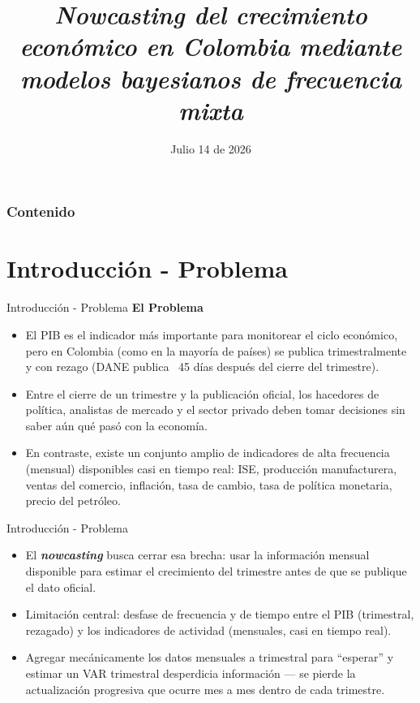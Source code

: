 \documentclass{beamer}
\title[35° Simposio Internacional de Estadística]{\textit{\textbf{Nowcasting} del crecimiento económico en Colombia mediante modelos bayesianos de frecuencia mixta}}
\author[Moreno, Olivero y Campo (2026). Nowcasting bayesiano]{Juan Diego Moreno Sánchez \inst{1} \and \and Zeneth Olivero Tapia \inst{2} \\[0.1cm]
\and Jacobo Campo Robledo \inst{1}^{,} \inst{2}}
\institute[Universidad Externado de Colombia -- Universidad Católica de Colombia]
{ 
		\inst{1} Universidad Externado de Colombia
		\and 	
		\inst{2} Universidad Católica de Colombia
}
\date{\footnotesize{Julio 14 de 2026}}
\begin{document}
\begin{frame}
	\titlepage
\end{frame}

\begin{frame}
	\frametitle{Contenido}
\end{frame}


\section{Introducción - Problema}

\begin{frame}{Introducción - Problema}
\textcolor[rgb]{0,0,1}{\textbf{El Problema}} 
\begin{itemize}\justifying
	\item El PIB es el indicador más importante para monitorear el ciclo económico, pero en Colombia (como en la mayoría de países) se publica trimestralmente y con rezago (DANE publica ~45 días después del cierre del trimestre). \pause
	\item Entre el cierre de un trimestre y la publicación oficial, los hacedores de política, analistas de mercado y el sector privado deben tomar decisiones sin saber aún qué pasó con la economía. \pause
	\item En contraste, existe un conjunto amplio de indicadores de alta frecuencia (mensual) disponibles casi en tiempo real: ISE, producción manufacturera, ventas del comercio, inflación, tasa de cambio, tasa de política monetaria, precio del petróleo.
\end{itemize}
\end{frame}

\begin{frame}{Introducción - Problema}{}
\begin{itemize}\justifying
	\item El \textit{\textbf{nowcasting}} busca cerrar esa brecha: usar la información mensual disponible para estimar el crecimiento del trimestre antes de que se publique el dato oficial. \pause
	\item Limitación central: desfase de frecuencia y de tiempo entre el PIB (trimestral, rezagado) y los indicadores de actividad (mensuales, casi en tiempo real). \pause
	\item Agregar mecánicamente los datos mensuales a trimestral para "`esperar"' y estimar un VAR trimestral desperdicia información — se pierde la actualización progresiva que ocurre mes a mes dentro de cada trimestre.
\end{itemize}
\end{frame}
\end{document}
